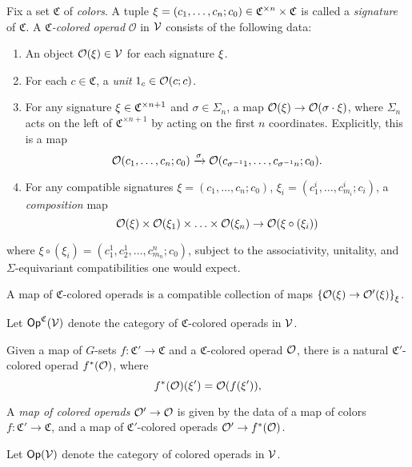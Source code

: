 \documentclass[a4paper,10pt
,draft
]{article}%
\renewcommand{\1}{\ensuremath{\mathbb{id}}}
\begin{document}
\begin{definition}
      Fix a set $\mathfrak C$ of \textit{colors}.
      A tuple
      $\xi = (c_1, \ldots, c_n; c_0) \in \mathfrak C^{\times n} \times \mathfrak C$
      is called a \textit{signature} of $\mathfrak C$.
      A \textit{$\mathfrak C$-colored operad} $\mathcal{O}$ in $\mathcal V$ consists of the following data:
      \begin{enumerate}[label = (\arabic*)]
      \item An object $\mathcal{O}(\xi) \in \mathcal V$ for each signature $\xi$.
      \item For each $c \in \mathfrak C$, a \textit{unit} $1_c \in \mathcal{O}(c;c)$.
      \item For any signature $\xi \in \mathfrak C^{\times n+1}$ and $\sigma \in \Sigma_n$, a map $\mathcal{O}(\xi) \to \mathcal{O}(\sigma \cdot \xi)$,
            where $\Sigma_n$ acts on the left of $\mathfrak C^{\times n+1}$ by acting on the first $n$ coordinates.
            Explicitly, this is a map
            \begin{equation}
                  \mathcal{O}(c_1, \ldots, c_n; c_0) \xrightarrow{\sigma} \mathcal{O}(c_{\sigma^{-1}1}, \ldots, c_{\sigma^{-1}n}; c_0).
            \end{equation}
      \item For any compatible signatures $\xi = (c_1, \ldots, c_n; c_0)$, $\xi_i = (c_{1}^i, \ldots, c_{m_i}^i; c_i)$, a \textit{composition} map
            \begin{equation}
                  \mathcal{O}(\xi) \times \mathcal{O}(\xi_1) \times \ldots \times \mathcal{O}(\xi_n) \to \mathcal{O}(\xi \circ (\xi_i))
            \end{equation}
      \end{enumerate}
      where $\xi \circ (\xi_i) = (c_1^1,c_2^1,\dots,c_{m_n}^{n}; c_0)$,
      subject to the associativity, unitality, and $\Sigma$-equivariant compatibilities one would expect.      
      
      A map of $\mathfrak C$-colored operads is a compatible collection of maps
      $\left\{\mathcal{O}(\xi) \to \mathcal{O}'(\xi)\right\}_{\xi}$.
      
      Let $\mathsf{Op}^{\mathfrak C}(\mathcal V)$ denote the category of $\mathfrak C$-colored operads in $\mathcal V$.
\end{definition}

\begin{definition}
      \label{OP_MAP_DEFN}
      Given a map of $G$-sets $f: \mathfrak C' \to \mathfrak C$ and a $\mathfrak C$-colored operad $\mathcal{O}$,
      there is a natural $\mathfrak C'$-colored operad $f^*(\mathcal{O})$, where
      \begin{equation}
            f^{\**}(\O)(\xi') = \O(f(\xi')),
      \end{equation}

      A \textit{map of colored operads} $\mathcal{O}' \to \mathcal{O}$ is given by the data of a map of colors $f: \mathfrak C' \to \mathfrak C$,
      and a map of $\mathfrak C'$-colored operads $\mathcal{O}' \to f^*(\mathcal{O})$.
      
      Let $\mathsf{Op}(\mathcal V)$ denote the category of colored operads in $\mathcal V$.
\end{definition}
\end{document}
